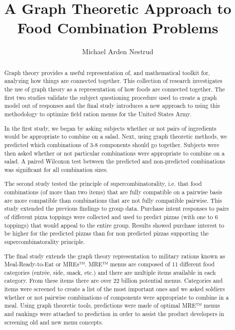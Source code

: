 \documentclass[phd,tocprelim]{cornell}
\title {A Graph Theoretic Approach to Food Combination Problems}
\author {Michael Arden Nestrud}
\begin{document}
\maketitle
{}
\makecopyright
{}
\begin{abstract}

Graph theory provides a useful representation of, and mathematical toolkit for, analyzing how things are connected together.  This collection of research investigates the use of graph theory as a representation of how foods are connected together.  The first two studies validate the subject questioning procedure used to create a graph model out of responses and the final study introduces a new approach to using this methodology to optimize field ration menus for the United States Army.

In the first study, we began by asking subjects whether or not pairs of ingredients would be appropriate to combine on a salad. Next, using graph theoretic methods, we predicted which combinations of 3-8 components should go together.  Subjects were then asked whether or not particular combinations were appropriate to combine on a salad. A paired Wilcoxon test between the predicted and non-predicted combinations was significant for all combination sizes.

The second study tested the principle of supercombinatorality, i.e. that food combinations (of more than two items) that are fully compatible on a pairwise basis are more compatible than combinations that are not fully compatible pairwise. This study extended the previous findings to group data. Purchase intent responses to pairs of different pizza toppings were collected and used to predict pizzas (with one to 6 toppings) that would appeal to the entire group. Results showed purchase interest to be higher for the predicted pizzas than for non predicted pizzas supporting the supercombinatorality principle. 

The final study extends the graph theory representation to military rations known as Meal-Ready-to-Eat or MREs™.  MRE™ menus are composed of 11 different food categories (entrée, side, snack, etc.) and there are multiple items available in each category.  From these items there are over 22 billion potential menus.  Categories and items were screened to create a list of the most important ones and we asked soldiers whether or not pairwise combinations of components were appropriate to combine in a meal.  Using graph theoretic tools, predictions were made of optimal MRE™ menus and rankings were attached to prediction in order to assist the product developers in screening old and new menu concepts. 
\end{abstract}
\end{document}
